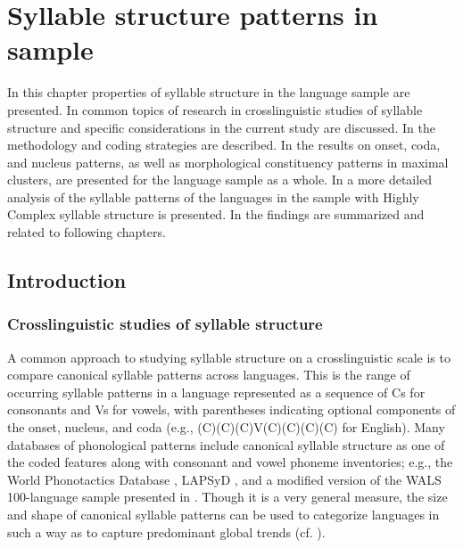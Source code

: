 \chapter{Syllable structure patterns in sample}\label{sec:3}

  In this chapter properties of syllable structure in the language sample are presented. In  common topics of research in crosslinguistic studies of syllable structure and specific considerations in the current study are discussed. In  the methodology and coding strategies are described. In  the results on onset, coda, and nucleus patterns, as well as morphological constituency patterns in maximal clusters, are presented for the language sample as a whole. In  a more detailed analysis of the syllable patterns of the languages in the sample with Highly Complex syllable structure is presented. In  the findings are summarized and related to following chapters.

\section{Introduction}\label{sec:3.1}
\subsection{Crosslinguistic studies of syllable structure}\label{sec:3.1.1}

  A common approach to studying syllable structure on a crosslinguistic scale is to compare canonical syllable patterns across languages. This is the range of occurring syllable patterns in a language represented as a sequence of Cs for consonants and Vs for vowels, with parentheses indicating optional components of the onset, nucleus, and coda (e.g., (C)(C)(C)V(C)(C)(C)(C) for English). Many databases of phonological patterns include canonical syllable structure as one of the coded features along with consonant and vowel phoneme inventories; e.g.,  the World Phonotactics Database \citep{DonohueEtAl2013}, LAPSyD \citep{MaddiesonEtAl2013}, and a modified version of the WALS 100-language sample presented in \citet{Gordon2016}. Though it is a very general measure, the size and shape of canonical syllable patterns can be used to categorize languages in such a way as to capture predominant global trends (cf. \citealt{Maddieson2013a}).

